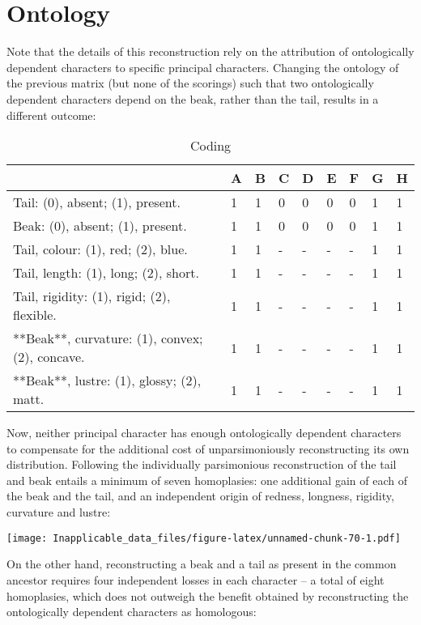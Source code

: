 \documentclass[]{book}
\theoremstyle{definition}
\theoremstyle{definition}
\theoremstyle{definition}
\theoremstyle{remark}
\begin{document}
\hypertarget{ontology}{%
\section{Ontology}\label{ontology}}

Note that the details of this reconstruction rely on the attribution of
ontologically dependent characters to specific principal characters.
Changing the ontology of the previous matrix (but none of the scorings)
such that two ontologically dependent characters depend on the beak,
rather than the tail, results in a different outcome:

\begin{table}

\caption{\label{tab:unnamed-chunk-69}Coding}
\centering
\begin{tabular}[t]{l|l|l|l|l|l|l|l|l}
\hline
  & A & B & C & D & E & F & G & H\\
\hline
Tail: (0), absent; (1), present. & 1 & 1 & 0 & 0 & 0 & 0 & 1 & 1\\
\hline
Beak: (0), absent; (1), present. & 1 & 1 & 0 & 0 & 0 & 0 & 1 & 1\\
\hline
Tail, colour: (1), red; (2), blue. & 1 & 1 & - & - & - & - & 1 & 1\\
\hline
Tail, length: (1), long; (2), short. & 1 & 1 & - & - & - & - & 1 & 1\\
\hline
Tail, rigidity: (1), rigid; (2), flexible. & 1 & 1 & - & - & - & - & 1 & 1\\
\hline
**Beak**, curvature: (1), convex; (2), concave. & 1 & 1 & - & - & - & - & 1 & 1\\
\hline
**Beak**, lustre: (1), glossy; (2), matt. & 1 & 1 & - & - & - & - & 1 & 1\\
\hline
\end{tabular}
\end{table}

Now, neither principal character has enough ontologically dependent
characters to compensate for the additional cost of unparsimoniously
reconstructing its own distribution. Following the individually
parsimonious reconstruction of the tail and beak entails a minimum of
seven homoplasies: one additional gain of each of the beak and the tail,
and an independent origin of redness, longness, rigidity, curvature and
lustre:

\texttt{[image: Inapplicable\_data\_files/figure-latex/unnamed-chunk-70-1.pdf]}

On the other hand, reconstructing a beak and a tail as present in the
common ancestor requires four independent losses in each character -- a
total of eight homoplasies, which does not outweigh the benefit obtained
by reconstructing the ontologically dependent characters as homologous:
\end{document}

